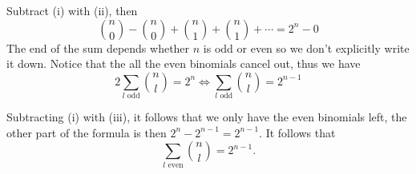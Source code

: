\begin{problem}
{{		\item Subtract (i) with (ii), then $$\binom{n}{0}-\binom{n}{0}+\binom{n}{1}+\binom{n}{1}+\cdots=2^n-0$$
		The end of the sum depends whether $n$ is odd or even so we don't explicitly write it down. Notice that the all the even binomials cancel out, thus we have 
		$$2\sum_{l \text{ odd}}\binom{n}{l}=2^n \iff \sum_{l \text{ odd}}\binom{n}{l}=2^{n-1}$$
		
		\item Subtracting (i) with (iii), it follows that we only have the even binomials left, the other part of the formula is then $2^n-2^{n-1}=2^{n-1}$. It follows that $$\sum_{l \text{ even}}\binom{n}{l}=2^{n-1}.$$
		}
	}
\end{problem}

\begin{problem}
\end{problem}

